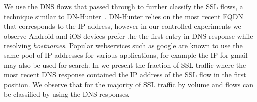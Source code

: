 

We use the DNS flows that passed through \platname to further classify
the SSL flows, a technique similar to
DN-Hunter~\cite{bermudez:dnhunter}.  DN-Hunter relies on the most
recent FQDN that corresponds to the IP address, however in our
controlled experiments we observe Android and iOS devices prefer the
the first entry in DNS response while resolving \emph{hostnames}.
Popular webservices such as google are known to use the same pool of
IP addresses for various applications, for example the IP for gmail
may also be used for search.  In
 we present the fraction of
SSL traffic where the most recent DNS response contained the IP
address of the SSL flow in the first position.  We observe that for
the majority of SSL traffic by volume and flows can be classified by
using the DNS responses.

